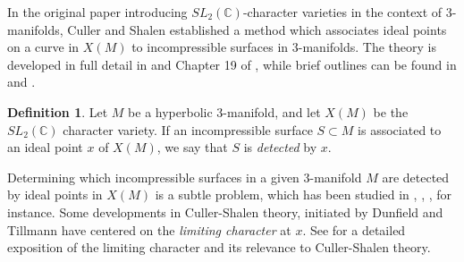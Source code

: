 \documentclass{article}
\theoremstyle{plain}
\theoremstyle{definition}
\newtheorem{definition}[theorem]{Definition}
\theoremstyle{plain}
\theoremstyle{plain}
\newtheorem{corollary}[theorem]{Corollary}
\theoremstyle{plain}
\theoremstyle{remark}
\theoremstyle{remark}
\theoremstyle{plain}
\theoremstyle{plain}
\begin{document}
%
%
%

In the original paper introducing $SL_2(\mathbb{C})$-character varieties in the context of 3-manifolds, Culler and Shalen established a method which associates ideal points on a curve in $X(M)$ to incompressible surfaces in 3-manifolds. The theory is developed in full detail in \cite{cullershalen} and Chapter 19 of \cite{handbook}, while brief outlines can be found in \cite{paoluzziporti} and \cite{wang}.

\begin{definition}
Let $M$ be a hyperbolic 3-manifold, and let $X(M)$ be the $SL_2(\mathbb{C})$ character variety. If an incompressible surface $S \subset M$ is associated to an ideal point $x$ of $X(M)$, we say that $S$ is \emph{detected} by $x$. 
\end{definition}

Determining which incompressible surfaces in a given 3-manifold $M$ are detected by ideal points in $X(M)$ is a subtle problem, which has been studied in \cite{Cooper1994PlaneCA}, \cite{paoluzziporti}, \cite{Chesebro2005NotAB}, for instance. Some developments in Culler-Shalen theory, initiated by Dunfield \cite{Dunfield2008AP1} and Tillmann \cite{tillmann} have centered on the \emph{limiting character} at $x$. See \cite{wang} for a detailed exposition of the limiting character and its relevance to Culler-Shalen theory.
\end{document}
